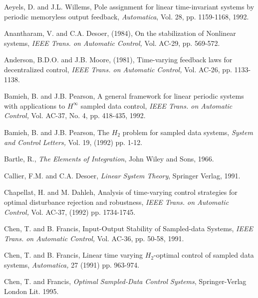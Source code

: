 
\begin{thebibliography}{99}



 Aeyels, D. and J.L. Willems, Pole assignment for linear
time-invariant systems by periodic memoryless output feedback, {\em
Automatica}, Vol. 28, pp. 1159-1168, 1992.


 Anantharam, V. and C.A. Desoer, (1984), On the  stabilization
 of  Nonlinear systems, {\em IEEE Trans. on Automatic Control,} Vol. AC-29, pp. 
569-572.

Anderson, B.D.O. and J.B. Moore, (1981), Time-varying feedback laws for
decentralized control, {\em IEEE Trans. on Automatic Control,} Vol.
AC-26, pp. 1133-1138.

 Bamieh, B. and J.B. Pearson, A general framework for linear
periodic systems with applications to $H^\infty$ sampled data control, {\em
IEEE Trans. on Automatic Control,} Vol. AC-37, No. 4, pp. 418-435, 1992.

 Bamieh, B. and J.B. Pearson, The $H_2$ problem  for  sampled data
systems, {\em System  and  Control Letters,} Vol. 19, (1992) pp. 1-12.


Bartle, R.,  {\em The Elements of  Integration}, John Wiley and Sons, 1966.




Callier, F.M.  and C.A. Desoer,  {\em Linear System Theory}, Springer  Verlag, 1991.

Chapellat, H. and M. Dahleh, Analysis of time-varying control
strategies for optimal disturbance rejection and robustness,  {\em IEEE
Trans. on Automatic Control,} Vol. AC-37, (1992) pp. 1734-1745.


 Chen, T. and B. Francis, Input-Output  Stability of  Sampled-data
Systems,  {\em IEEE Trans. on Automatic Control,} Vol. AC-36, pp. 50-58, 1991.

 Chen, T. and B. Francis, Linear time varying  $H_2$-optimal control
of sampled data systems,  {\em Automatica,} 27 (1991) pp. 963-974.


 Chen, T. and Francis, {\em Optimal Sampled-Data Control Systems},
 Springer-Verlag London Lit. 1995.



\end{thebibliography}
